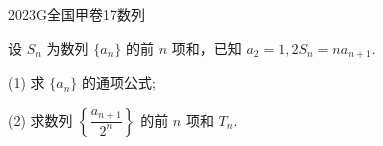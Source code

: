 
\begin{problem}{2023}{G}{全国甲卷}{17}{数列}

设 $S_n$ 为数列 $\{a_n\}$ 的前 $n$ 项和，已知 $a_2=1, 2S_n=na_{n+1}$.

(1) 求 $\{a_n\}$ 的通项公式;

(2) 求数列 $\left\{\dfrac{a_{n+1}}{2^n}\right\}$ 的前 $n$ 项和 $T_n$.

\end{problem}